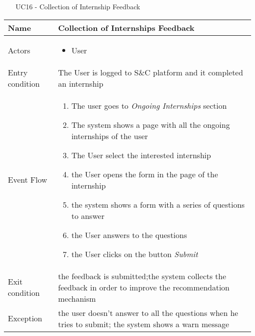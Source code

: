 						\begin{table} [H]
					\centering
					\begin{itemize}
						\item [UC16] - Collection of Internship Feedback
					\end{itemize}
					
					\begin{tabular}{|| P{7.5cm} | P{7.5cm} ||}
						\hline
						Name & Collection of Internships Feedback \\
						\hline
						Actors & \parbox{5cm}{\begin{itemize}
								\item User
							\end{itemize}
						} \\
						\hline
						Entry condition & The User is logged to S\&C platform and it completed an internship \\
						\hline
						Event Flow & \parbox{5cm}{\begin{enumerate}
								\item The user goes to \textit{Ongoing Internships} section
								\item The system shows a page with 
								all the ongoing internships of the user 
								\item The User select the interested 
								internship  
								\item the User opens the form in the page of the internship
								\item the system shows a form with a series of questions to answer 
								\item the User answers to the questions
								\item the User clicks on the button \textit{Submit}
						\end{enumerate}} \\
						\hline 
						Exit condition & the feedback is submitted;the system collects the
						feedback in order to improve the recommendation
						mechanism \\
						\hline
						Exception & the user doesn't answer to all the questions when he tries to submit; the system shows a warn message \\
						\hline
					\end{tabular}
				\end{table}
				
